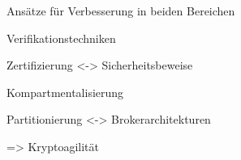 
\begin{frame}[c]{Ansätze für Verbesserung in beiden Bereichen}

  Verifikationstechniken
  \vspace{0.5em}

  {\footnotesize Zertifizierung <-> Sicherheitsbeweise}
  \vspace{1.5em}

  Kompartmentalisierung
  \vspace{0.5em}

  {\footnotesize Partitionierung <-> Brokerarchitekturen}
  \vspace{1.5em}


  => Kryptoagilität
\end{frame}
